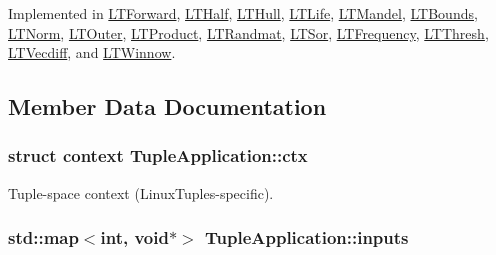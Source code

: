 Implemented in \hyperlink{class_l_t_forward_d98aff7a063bf6e8542046c6f2c097fa}{LTForward}, \hyperlink{class_l_t_half_e60dd430fb782498837492c0331e0dea}{LTHalf}, \hyperlink{class_l_t_hull_829b19b354bbe61d7cd5250819bd7b63}{LTHull}, \hyperlink{class_l_t_life_c0600864c1742c2a12e15992c539c2da}{LTLife}, \hyperlink{class_l_t_mandel_5ea4d32e6d16f64148bddbb940d732da}{LTMandel}, \hyperlink{class_l_t_bounds_877b72b63e19fbb7114bae270fe20c53}{LTBounds}, \hyperlink{class_l_t_norm_f0905a2c85b2e2713e98b9b22714a022}{LTNorm}, \hyperlink{class_l_t_outer_e0b1322b40271bb94c272b6117c8d16c}{LTOuter}, \hyperlink{class_l_t_product_1ba17b14e59b82c917f404cc9642bb09}{LTProduct}, \hyperlink{class_l_t_randmat_fffb75c16f2aaaa2f1bdb8a52f79234c}{LTRandmat}, \hyperlink{class_l_t_sor_48363c30cbba1c5ca61ed86260db94af}{LTSor}, \hyperlink{class_l_t_frequency_7c47cf36b228505f79225a3fe8a00f01}{LTFrequency}, \hyperlink{class_l_t_thresh_3cff6d04c7389a32e1dca924c7f93e23}{LTThresh}, \hyperlink{class_l_t_vecdiff_0117017e12284b1eb57532ca447684f6}{LTVecdiff}, and \hyperlink{class_l_t_winnow_472d0a232050f4674339029b1aa47531}{LTWinnow}.

\subsection{Member Data Documentation}
\hypertarget{class_tuple_application_773a45a8a04a872fd9c42b9ec07c8ebd}{
\subsubsection[{ctx}]{\setlength{\rightskip}{0pt plus 5cm}struct context {\bf TupleApplication::ctx}}}
\label{class_tuple_application_773a45a8a04a872fd9c42b9ec07c8ebd}


Tuple-space context (LinuxTuples-specific). \hypertarget{class_tuple_application_92a57e83bfd67542ae58e6a78720a3ef}{
\subsubsection[{inputs}]{\setlength{\rightskip}{0pt plus 5cm}std::map$<$int, void$\ast$$>$ {\bf TupleApplication::inputs}}}
\label{class_tuple_application_92a57e83bfd67542ae58e6a78720a3ef}


